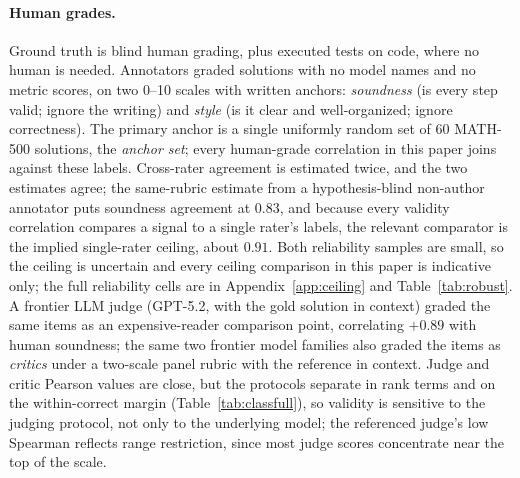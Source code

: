 \paragraph{Human grades.}
Ground truth is blind human grading, plus executed tests on code, where no human is needed.
Annotators graded solutions with no model names and no metric scores, on two 0--10 scales with written anchors: \emph{soundness} (is every step valid; ignore the writing) and \emph{style} (is it clear and well-organized; ignore correctness).
The primary anchor is a single uniformly random set of 60 \textsc{MATH-500} solutions, the \emph{anchor set}; every human-grade correlation in this paper joins against these labels.
Cross-rater agreement is estimated twice, and the two estimates agree; the same-rubric estimate from a hypothesis-blind non-author annotator puts soundness agreement at $0.83$, and because every validity correlation compares a signal to a single rater's labels, the relevant comparator is the implied single-rater ceiling, about $0.91$.
Both reliability samples are small, so the ceiling is uncertain and every ceiling comparison in this paper is indicative only; the full reliability cells are in Appendix~\ref{app:ceiling} and Table~\ref{tab:robust}.
A frontier LLM judge (GPT-5.2, with the gold solution in context) graded the same items as an expensive-reader comparison point, correlating $+0.89$ with human soundness; the same two frontier model families also graded the items as \emph{critics} under a two-scale panel rubric with the reference in context.
Judge and critic Pearson values are close, but the protocols separate in rank terms and on the within-correct margin (Table~\ref{tab:classfull}), so validity is sensitive to the judging protocol, not only to the underlying model; the referenced judge's low Spearman reflects range restriction, since most judge scores concentrate near the top of the scale.

